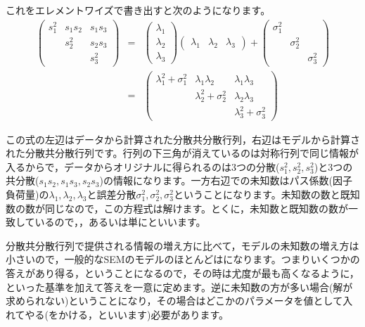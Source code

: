 \documentclass{ltjsbook}
\begin{document}
これをエレメントワイズで書き出すと次のようになります。
\begin{eqnarray*}
	\begin{pmatrix} s_1^2 & s_1s_2 & s_1s_3 \\
                      & s_2^2  & s_2s_3 \\
                      &        & s_3^2\end{pmatrix}
	&=& \begin{pmatrix} \lambda_1\\ \lambda_2 \\ \lambda_3 \end{pmatrix}\begin{pmatrix} \lambda_1 & \lambda_2 & \lambda_3 \end{pmatrix} + \begin{pmatrix} \sigma_1^2 & & \\ & \sigma_2^2 & \\ & & \sigma_3^2 \end{pmatrix} \\
	&=& \begin{pmatrix} \lambda_1^2 + \sigma_1^2 & \lambda_1\lambda_2       & \lambda_1 \lambda_3      \\
                                          & \lambda_2^2 + \sigma_2^2 & \lambda_2 \lambda_3      \\
                                          &                          & \lambda_3^2 + \sigma_3^2\end{pmatrix}
\end{eqnarray*}

この式の左辺はデータから計算された分散共分散行列，右辺はモデルから計算された分散共分散行列です。行列の下三角が消えているのは対称行列で同じ情報が入るからで，データからオリジナルに得られるのは3つの分散($s_1^2,s_2^2,s_3^2$)と3つの共分散($s_1s_2,s_1s_3,s_2s_3$)の情報になります。一方右辺での未知数はパス係数(因子負荷量)の$\lambda_1,\lambda_2,\lambda_3$と誤差分散$\sigma_1^2,\sigma_2^2,\sigma_3^2$ということになります。未知数の数と既知数の数が同じなので，この方程式は解けます。とくに，未知数と既知数の数が一致しているので，，あるいは単にといいます。

分散共分散行列で提供される情報の増え方に比べて，モデルの未知数の増え方は小さいので，一般的なSEMのモデルのほとんどはになります。つまりいくつかの答えがあり得る，ということになるので，その時は尤度が最も高くなるように，といった基準を加えて答えを一意に定めます。逆に未知数の方が多い場合(解が求められない)ということになり，その場合はどこかのパラメータを値として入れてやる(をかける，といいます)必要があります。
\end{document}

